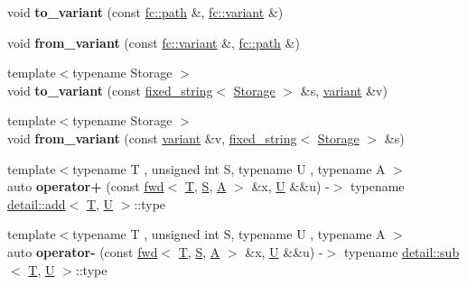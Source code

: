 \begin{DoxyCompactItemize}
void {\bfseries to\+\_\+variant} (const \mbox{\hyperlink{classfc_1_1path}{fc\+::path}} \&, \mbox{\hyperlink{classfc_1_1variant}{fc\+::variant}} \&)
\item 
\mbox{\label{namespacefc_a77f02042bd60e2889251c4ffd5cda0be}} 
void {\bfseries from\+\_\+variant} (const \mbox{\hyperlink{classfc_1_1variant}{fc\+::variant}} \&, \mbox{\hyperlink{classfc_1_1path}{fc\+::path}} \&)
\item 
\mbox{\label{namespacefc_a31c6777bee4c12efd46a29aeb2b0ba83}} 
{\footnotesize template$<$typename Storage $>$ }\\void {\bfseries to\+\_\+variant} (const \mbox{\hyperlink{classfc_1_1fixed__string}{fixed\+\_\+string}}$<$ \mbox{\hyperlink{struct_storage}{Storage}} $>$ \&s, \mbox{\hyperlink{classfc_1_1variant}{variant}} \&v)
\item 
\mbox{\label{namespacefc_aaf6dfea358745d1b3092d2fe6df02a6f}} 
{\footnotesize template$<$typename Storage $>$ }\\void {\bfseries from\+\_\+variant} (const \mbox{\hyperlink{classfc_1_1variant}{variant}} \&v, \mbox{\hyperlink{classfc_1_1fixed__string}{fixed\+\_\+string}}$<$ \mbox{\hyperlink{struct_storage}{Storage}} $>$ \&s)
\item 
\mbox{\label{namespacefc_a2b8e30247189705c9bd2a495eec53229}} 
{\footnotesize template$<$typename T , unsigned int S, typename U , typename A $>$ }\\auto {\bfseries operator+} (const \mbox{\hyperlink{classfc_1_1fwd}{fwd}}$<$ \mbox{\hyperlink{struct_t}{T}}, \mbox{\hyperlink{struct_s}{S}}, \mbox{\hyperlink{struct_a}{A}} $>$ \&x, \mbox{\hyperlink{union_u}{U}} \&\&u) -\/$>$ typename \mbox{\hyperlink{structfc_1_1detail_1_1add}{detail\+::add}}$<$ \mbox{\hyperlink{struct_t}{T}}, \mbox{\hyperlink{union_u}{U}} $>$\+::type
\item 
\mbox{\label{namespacefc_a2db96673fde8ae64be589f48e8bf158e}} 
{\footnotesize template$<$typename T , unsigned int S, typename U , typename A $>$ }\\auto {\bfseries operator-\/} (const \mbox{\hyperlink{classfc_1_1fwd}{fwd}}$<$ \mbox{\hyperlink{struct_t}{T}}, \mbox{\hyperlink{struct_s}{S}}, \mbox{\hyperlink{struct_a}{A}} $>$ \&x, \mbox{\hyperlink{union_u}{U}} \&\&u) -\/$>$ typename \mbox{\hyperlink{structfc_1_1detail_1_1sub}{detail\+::sub}}$<$ \mbox{\hyperlink{struct_t}{T}}, \mbox{\hyperlink{union_u}{U}} $>$\+::type

\end{DoxyCompactItemize}
